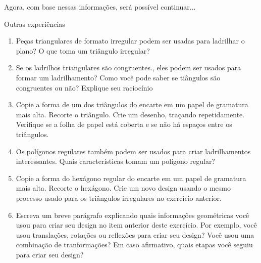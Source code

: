 Agora, com base nessas informações, será possível continuar...


\begin{task}{Outras experiências}

\begin{enumerate}
\item Peças triangulares de formato irregular podem ser usadas para ladrilhar o plano? O que toma um triângulo irregular?
\item Se os ladrilhos triangulares são congruentes., eles podem ser usados para formar um ladrilhamento? Como você pode saber se tiângulos são congruentes ou não? Explique seu raciocínio
\item Copie a forma de um dos triângulos do encarte em um papel de gramatura mais alta. Recorte o triângulo. Crie um desenho, traçando repetidamente. Verifique se a folha de papel está coberta e se não há espaços entre os triângulos.
\item Os polígonos regulares também podem ser usados para criar ladrilhamentos interessantes. Quais características tomam um polígono regular?
\item Copie a forma do hexágono regular do encarte em um papel de gramatura mais alta. Recorte o hexágono. Crie um novo design usando o mesmo processo usado para os triângulos irregulares no exercício anterior.
\item Escreva um breve parágrafo explicando quais informações geométricas você usou para criar seu design no item anterior deste exercício. Por exemplo, você usou translações, rotações ou reflexões para criar seu design? Você usou uma combinação de tranformações? Em caso afirmativo, quais etapas você seguiu para criar seu design?
\end{enumerate}

\end{task}


